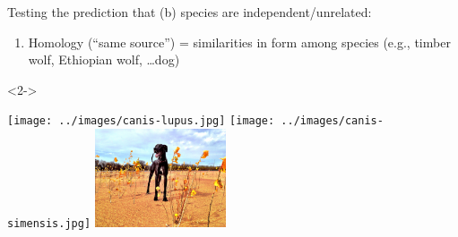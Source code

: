 \begin{frame}[t]

    Testing the prediction that (b) species are independent/unrelated:

    \begin{enumerate}
        \item Homology (``same source'') = similarities in form among species
            (e.g., timber wolf, Ethiopian wolf, \ldots dog)
    \end{enumerate}

    \vspace{-3mm}
    \begin{uncoverenv}<2->
    \begin{center}
    \texttt{[image: ../images/canis-lupus.jpg]}\hspace{0.1mm}
    \texttt{[image: ../images/canis-simensis.jpg]}\hspace{0.1mm}
    \includegraphics[height=2.9cm]{../images/luna.jpg}
    \end{center}
    \end{uncoverenv}

    \vspace{-3mm}
\end{frame}

